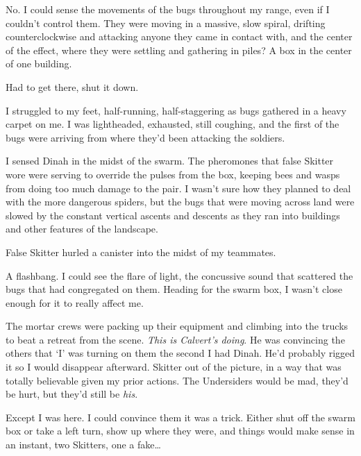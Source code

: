 No.  I could sense the movements of the bugs throughout my range, even if I couldn't control them.  They were moving in a massive, slow spiral, drifting counterclockwise and attacking anyone they came in contact with, and the center of the effect, where they were settling and gathering in piles?  A box in the center of one building.



Had to get there, shut it down.



I struggled to my feet, half-running, half-staggering as bugs gathered in a heavy carpet on me.  I was lightheaded, exhausted, still coughing, and the first of the bugs were arriving from where they'd been attacking the soldiers.



I sensed Dinah in the midst of the swarm.  The pheromones that false Skitter wore were serving to override the pulses from the box, keeping bees and wasps from doing too much damage to the pair.  I wasn't sure how they planned to deal with the more dangerous spiders, but the bugs that were moving across land were slowed by the constant vertical ascents and descents as they ran into buildings and other features of the landscape.



False Skitter hurled a canister into the midst of my teammates.



A flashbang.  I could see the flare of light, the concussive sound that scattered the bugs that had congregated on them.  Heading for the swarm box, I wasn't close enough for it to really affect me.



The mortar crews were packing up their equipment and climbing into the trucks to beat a retreat from the scene.  \emph{This is Calvert's doing}.  He was convincing the others that `I' was turning on them the second I had Dinah.  He'd probably rigged it so I would disappear afterward.  Skitter out of the picture, in a way that was totally believable given my prior actions.  The Undersiders would be mad, they'd be hurt, but they'd still be \emph{his}.



Except I was here.  I could convince them it was a trick.  Either shut off the swarm box or take a left turn, show up where they were, and things would make sense in an instant, two Skitters, one a fake\ldots



